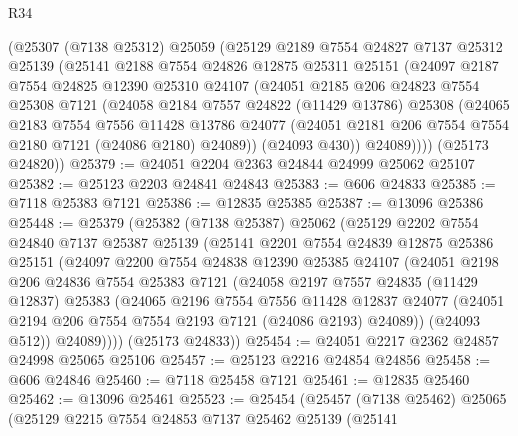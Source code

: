 \begin{lexlean}{R34}
\begin{coremodule}
    (@25307
      (@7138 @25312)
      @25059
      (@25129
        @2189
        @7554
        @24827
        @7137
        @25312
        @25139
        (@25141
          @2188
          @7554
          @24826
          @12875
          @25311
          @25151
          (@24097
            @2187
            @7554
            @24825
            @12390
            @25310
            @24107
            (@24051
              @2185
              @206
              @24823
              @7554
              @25308
              @7121
              (@24058
                @2184
                @7557
                @24822
                (@11429 @13786)
                @25308
                (@24065
                  @2183
                  @7554
                  @7556
                  @11428
                  @13786
                  @24077
                  (@24051 @2181 @206 @7554 @7554 @2180 @7121 (@24086 @2180) @24089))
                (@24093 @430))
              @24089))))
      (@25173 @24820))
@25379 := @24051 @2204 @2363 @24844 @24999 @25062 @25107
@25382 := @25123 @2203 @24841 @24843
@25383 := @606 @24833
@25385 := @7118 @25383 @7121
@25386 := @12835 @25385
@25387 := @13096 @25386
@25448 := @25379
    (@25382
      (@7138 @25387)
      @25062
      (@25129
        @2202
        @7554
        @24840
        @7137
        @25387
        @25139
        (@25141
          @2201
          @7554
          @24839
          @12875
          @25386
          @25151
          (@24097
            @2200
            @7554
            @24838
            @12390
            @25385
            @24107
            (@24051
              @2198
              @206
              @24836
              @7554
              @25383
              @7121
              (@24058
                @2197
                @7557
                @24835
                (@11429 @12837)
                @25383
                (@24065
                  @2196
                  @7554
                  @7556
                  @11428
                  @12837
                  @24077
                  (@24051 @2194 @206 @7554 @7554 @2193 @7121 (@24086 @2193) @24089))
                (@24093 @512))
              @24089))))
      (@25173 @24833))
@25454 := @24051 @2217 @2362 @24857 @24998 @25065 @25106
@25457 := @25123 @2216 @24854 @24856
@25458 := @606 @24846
@25460 := @7118 @25458 @7121
@25461 := @12835 @25460
@25462 := @13096 @25461
@25523 := @25454
    (@25457
      (@7138 @25462)
      @25065
      (@25129
        @2215
        @7554
        @24853
        @7137
        @25462
        @25139
        (@25141

\end{coremodule}
\end{lexlean}
